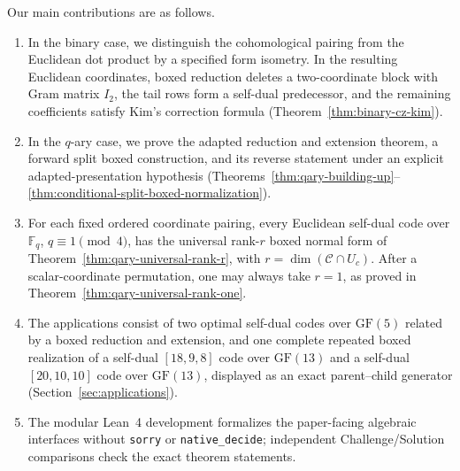 \documentclass[12pt]{article}
\newcommand{\F}{\mathbb{F}}
\newcommand{\GF}[1]{\ensuremath{\mathrm{GF}(#1)}}
\begin{document}
Our main contributions are as follows.
\begin{enumerate}[label=(\arabic*)]



\item In the binary case, we distinguish the cohomological pairing from the
Euclidean dot product by a specified form isometry. In the resulting
Euclidean coordinates, boxed reduction deletes a two-coordinate block with
Gram matrix \(I_2\), the tail rows form a self-dual predecessor, and the
remaining coefficients satisfy Kim's correction formula
(Theorem~\ref{thm:binary-cz-kim}).

\item In the \(q\)-ary case, we prove the adapted reduction and extension
theorem, a forward split boxed construction, and its reverse statement under
an explicit adapted-presentation hypothesis
(Theorems~\ref{thm:qary-building-up}--\ref{thm:conditional-split-boxed-normalization}).

\item For each fixed ordered coordinate pairing, every Euclidean self-dual
code over \(\F_q\), \(q\equiv1\pmod4\), has the universal rank-\(r\) boxed
normal form of Theorem~\ref{thm:qary-universal-rank-r}, with
\(r=\dim(\mathcal C\cap U_c)\).  After a scalar-coordinate permutation, one may
always take \(r=1\), as proved in
Theorem~\ref{thm:qary-universal-rank-one}.

\item The applications consist of two optimal self-dual codes over
\(\GF{5}\) related by a boxed reduction and extension, and one complete
repeated boxed realization of a self-dual \([18,9,8]\) code over
\(\GF{13}\) and a self-dual \([20,10,10]\) code over \(\GF{13}\), displayed
as an exact parent--child generator (Section~\ref{sec:applications}).

\item The modular Lean~4 development formalizes the paper-facing algebraic
interfaces without \texttt{sorry} or \texttt{native\_decide}; independent
Challenge/Solution comparisons check the exact theorem statements.
\end{enumerate}
\end{document}
